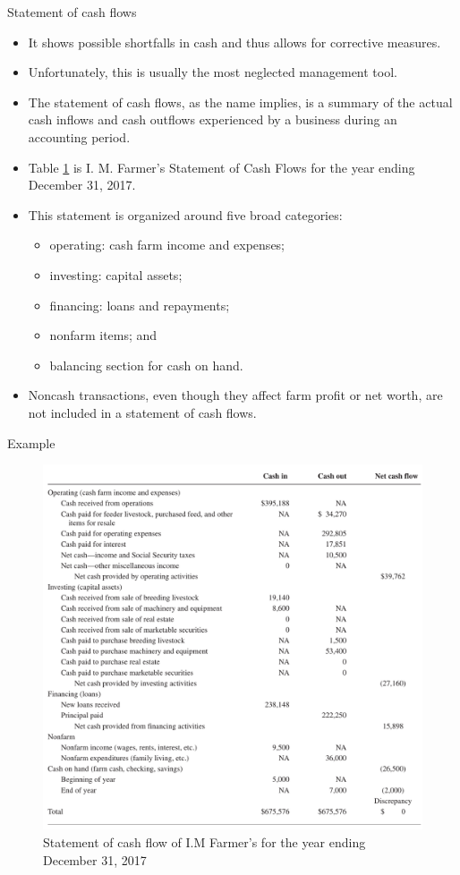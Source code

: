 \documentclass[12pt,ignorenonframetext,aspectratio=169]{beamer}
\providecommand{\tightlist}{%
  \setlength{\itemsep}{0pt}\setlength{\parskip}{0pt}}
\begin{document}
\begin{frame}{Statement of cash flows}
\protect\hypertarget{statement-of-cash-flows}{}
\begin{itemize}
\tightlist
\item
  It shows possible shortfalls in cash and thus allows for corrective
  measures.
\item
  Unfortunately, this is usually the most neglected management tool.
\item
  The statement of cash flows, as the name implies, is a summary of the
  actual cash inflows and cash outflows experienced by a business during
  an accounting period.
\item
  Table \ref{fig:cash-flow-statement} is I. M. Farmer's Statement of
  Cash Flows for the year ending December 31, 2017.
\item
  This statement is organized around five broad categories:

  \begin{itemize}
  \tightlist
  \item
    operating: cash farm income and expenses;
  \item
    investing: capital assets;
  \item
    financing: loans and repayments;
  \item
    nonfarm items; and
  \item
    balancing section for cash on hand.
  \end{itemize}
\item
  Noncash transactions, even though they affect farm profit or net
  worth, are not included in a statement of cash flows.
\end{itemize}
\end{frame}

\begin{frame}{Example}
\protect\hypertarget{example-2}{}
\begin{figure}

{\centering \includegraphics[width=.8\textwidth]{./figs/cash_flow_statement} 

}

\caption{Statement of cash flow of I.M Farmer's for the year ending December 31, 2017}\label{fig:cash-flow-statement}
\end{figure}
\end{frame}
\end{document}
